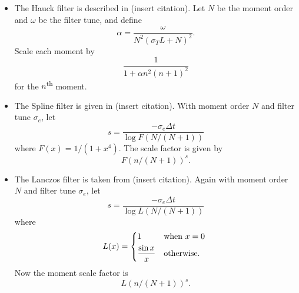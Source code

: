 \documentclass{article}
\begin{document}
\begin{itemize}
    \item The Hauck filter is described in (insert citation).
    Let $N$ be the moment order and $\omega$ be the filter tune, and define
    \begin{equation}
        \alpha = \frac{\omega}{N^2 (\sigma_T L + N)^2}.
    \end{equation}
    Scale each moment by
    \begin{equation}
        \frac{1}{1 + \alpha n^2 (n+1)^2}
    \end{equation}
    for the $n$\textsuperscript{th} moment.

    \item The Spline filter is given in (insert citation).
    With moment order $N$ and filter tune $\sigma_e$, let
    \begin{equation}
        s = \frac{-\sigma_e \Delta t}{\log F(N/(N+1))}
    \end{equation}
    where $F(x) = 1/(1 + x^4)$. The scale factor is given by
    \begin{equation}
        F(n/(N+1))^s.
    \end{equation}

    \item The Lanczos filter is taken from (insert citation).
    Again with moment order $N$ and filter tune $\sigma_e$, let
    \begin{equation}
        s = \frac{-\sigma_e \Delta t}{\log L(N / (N+1))}
    \end{equation}
    where
    \begin{equation}
        L(x) = \begin{dcases*}
            1 & when $x=0$ \\
            \frac{\sin x}{x} & otherwise.
        \end{dcases*}
    \end{equation}
    Now the moment scale factor is
    \begin{equation}
        L(n / (N+1))^s.
    \end{equation}
\end{itemize}
\end{document}
